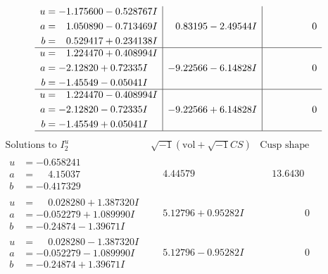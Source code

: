 \documentclass[1p]{elsarticle_modified}
\theoremstyle{definition}
\newcommand{\I}{\sqrt{-1}}
\begin{document}
$$\begin{array}{c|c|c}
\begin{aligned}
u &= -1.175600 - 0.528767 I \\
a &= \phantom{-}1.050890 - 0.713469 I \\
b &= \phantom{-}0.529417 + 0.234138 I\end{aligned}
 & \phantom{-}0.83195 - 2.49544 I & \phantom{-0.000000 } 0 \\ \hline\begin{aligned}
u &= \phantom{-}1.224470 + 0.408994 I \\
a &= -2.12820 + 0.72335 I \\
b &= -1.45549 - 0.05041 I\end{aligned}
 & -9.22566 - 6.14828 I & \phantom{-0.000000 } 0 \\ \hline\begin{aligned}
u &= \phantom{-}1.224470 - 0.408994 I \\
a &= -2.12820 - 0.72335 I \\
b &= -1.45549 + 0.05041 I\end{aligned}
 & -9.22566 + 6.14828 I & \phantom{-0.000000 } 0\\
 \hline 
 \end{array}$$\newpage$$\begin{array}{c|c|c}  
\text{Solutions to }I^u_{2}& \I (\text{vol} + \sqrt{-1}CS) & \text{Cusp shape}\\
 \hline 
\begin{aligned}
u &= -0.658241\phantom{ +0.000000I} \\
a &= \phantom{-}4.15037\phantom{ +0.000000I} \\
b &= -0.417329\phantom{ +0.000000I}\end{aligned}
 & \phantom{-}4.44579\phantom{ +0.000000I} & \phantom{-}13.6430\phantom{ +0.000000I} \\ \hline\begin{aligned}
u &= \phantom{-}0.028280 + 1.387320 I \\
a &= -0.052279 + 1.089990 I \\
b &= -0.24874 - 1.39671 I\end{aligned}
 & \phantom{-}5.12796 + 0.95282 I & \phantom{-0.000000 } 0 \\ \hline\begin{aligned}
u &= \phantom{-}0.028280 - 1.387320 I \\
a &= -0.052279 - 1.089990 I \\
b &= -0.24874 + 1.39671 I\end{aligned}
 & \phantom{-}5.12796 - 0.95282 I & \phantom{-0.000000 } 0 \\ \hline\begin{aligned}

\end{aligned}
\end{array}$$
\end{document}
